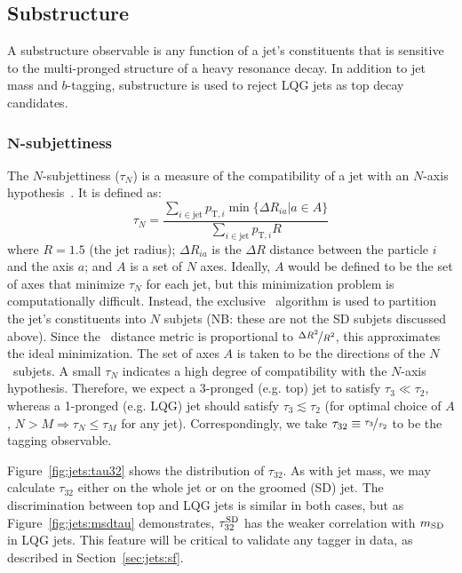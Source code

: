 \subsection{Substructure}

A substructure observable is any function of a jet's constituents that is sensitive to the multi-pronged structure of a heavy resonance decay. 
In addition to jet mass and $b$-tagging, substructure is used to reject LQG jets as top decay candidates. 

\subsubsection{$\bm{N}$-subjettiness}

The $N$-subjettiness ($\tau_N$) is a measure of the compatibility of a jet with an $N$-axis hypothesis~\cite{nsub}.
It is defined as:
\begin{equation}
    \tau_N = \frac{\sum_{i\in\mathrm{jet}} p_{\mathrm{T},i} \min\{\Delta R_{ia} | a\in A\}}{\sum_{i\in\mathrm{jet}} p_{\mathrm{T},i} R}
\end{equation}
where $R=1.5$ (the jet radius); $\Delta R_{ia}$ is the $\Delta R$ distance between the particle $i$ and the axis $a$; and $A$ is a set of $N$ axes. 
Ideally, $A$ would be defined to be the set of axes that minimize $\tau_N$ for each jet, but this minimization problem is computationally difficult.  
Instead, the exclusive \kt~algorithm is used to partition the jet's constituents into $N$ subjets (NB: these are not the SD subjets discussed above).
Since the \kt~distance metric is proportional to $\nicefrac{\Delta R^2}{R^2}$, this approximates the ideal minimization.
The set of axes $A$ is taken to be the directions of the $N$ \kt~subjets. 
A small $\tau_N$ indicates a high degree of compatibility with the $N$-axis hypothesis.
Therefore, we expect a 3-pronged (e.g. top) jet to satisfy $\tau_3 \ll \tau_2$, whereas a 1-pronged (e.g. LQG) jet should satisfy $\tau_3 \lesssim \tau_2$ (for optimal choice of $A$, $N>M \Rightarrow \tau_{N} \leq \tau_{M}$ for any jet). 
Correspondingly, we take $\tau_{32} \equiv \nicefrac{\tau_3}{\tau_2}$ to be the tagging observable. 

Figure~\ref{fig:jets:tau32} shows the distribution of $\tau_{32}$.
As with jet mass, we may calculate $\tau_{32}$ either on the whole jet or on the groomed (SD) jet.
The discrimination between top and LQG jets is similar in both cases, but as Figure~\ref{fig:jets:msdtau} demonstrates, $\tau_{32}^{\mathrm{SD}}$ has the weaker correlation with $m_{\mathrm{SD}}$ in LQG jets. 
This feature will be critical to validate any tagger in data, as described in Section~\ref{sec:jets:sf}.

